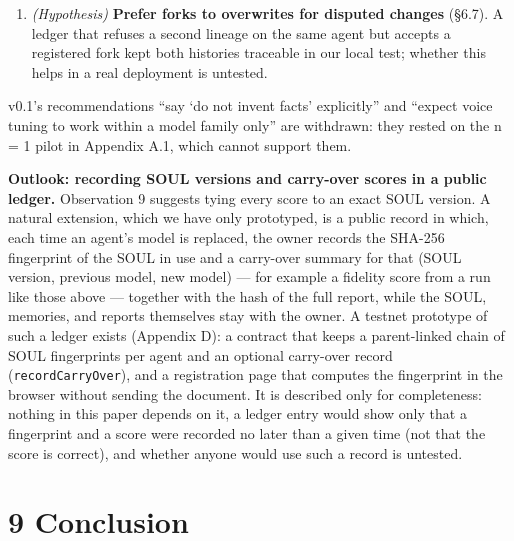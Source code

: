 \documentclass[10pt]{article}
\begin{document}
\begin{enumerate}
  \textbf{Keep a change record next to every change} (§6.6). With the diff alone, most legitimate changes looked suspicious (L recall 0.40); with who-proposed/who-approved/why and the cited entries, every legitimate change was accepted. A valid signature did not add to this, and a signature over a summary that does not mention a weakening (M3) was the error that remained for the models and that the human grader missed every time; compare the signed summary with the diff rather than trusting the signature.
\item
  \emph{(Hypothesis)} \textbf{Prefer forks to overwrites for disputed changes} (§6.7). A ledger that refuses a second lineage on the same agent but accepts a registered fork kept both histories traceable in our local test; whether this helps in a real deployment is untested.
\end{enumerate}

v0.1's recommendations ``say `do not invent facts' explicitly'' and ``expect voice tuning to work within a model family only'' are withdrawn: they rested on the n = 1 pilot in Appendix A.1, which cannot support them.

\textbf{Outlook: recording SOUL versions and carry-over scores in a public ledger.} Observation 9 suggests tying every score to an exact SOUL version. A natural extension, which we have only prototyped, is a public record in which, each time an agent's model is replaced, the owner records the SHA-256 fingerprint of the SOUL in use and a carry-over summary for that (SOUL version, previous model, new model) --- for example a fidelity score from a run like those above --- together with the hash of the full report, while the SOUL, memories, and reports themselves stay with the owner. A testnet prototype of such a ledger exists (Appendix D): a contract that keeps a parent-linked chain of SOUL fingerprints per agent and an optional carry-over record (\texttt{recordCarryOver}), and a registration page that computes the fingerprint in the browser without sending the document. It is described only for completeness: nothing in this paper depends on it, a ledger entry would show only that a fingerprint and a score were recorded no later than a given time (not that the score is correct), and whether anyone would use such a record is untested.

\section{9 Conclusion}\label{conclusion}
\end{document}
